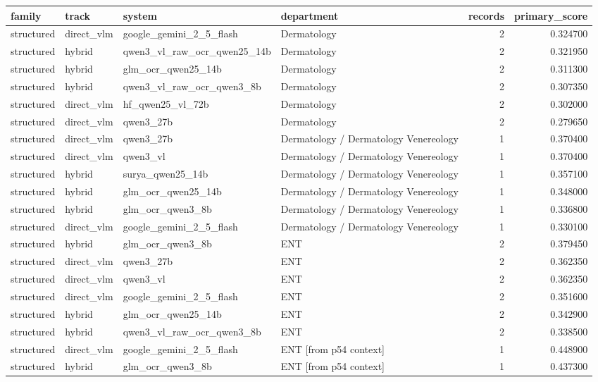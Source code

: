 \begin{tabular}{llllrr}
\toprule
family & track & system & department & records & primary\_score \\
\midrule
structured & direct\_vlm & google\_gemini\_2\_5\_flash & Dermatology & 2 & 0.324700 \\
structured & hybrid & qwen3\_vl\_raw\_ocr\_qwen25\_14b & Dermatology & 2 & 0.321950 \\
structured & hybrid & glm\_ocr\_qwen25\_14b & Dermatology & 2 & 0.311300 \\
structured & hybrid & qwen3\_vl\_raw\_ocr\_qwen3\_8b & Dermatology & 2 & 0.307350 \\
structured & direct\_vlm & hf\_qwen25\_vl\_72b & Dermatology & 2 & 0.302000 \\
structured & direct\_vlm & qwen3\_27b & Dermatology & 2 & 0.279650 \\
structured & direct\_vlm & qwen3\_27b & Dermatology / Dermatology Venereology & 1 & 0.370400 \\
structured & direct\_vlm & qwen3\_vl & Dermatology / Dermatology Venereology & 1 & 0.370400 \\
structured & hybrid & surya\_qwen25\_14b & Dermatology / Dermatology Venereology & 1 & 0.357100 \\
structured & hybrid & glm\_ocr\_qwen25\_14b & Dermatology / Dermatology Venereology & 1 & 0.348000 \\
structured & hybrid & glm\_ocr\_qwen3\_8b & Dermatology / Dermatology Venereology & 1 & 0.336800 \\
structured & direct\_vlm & google\_gemini\_2\_5\_flash & Dermatology / Dermatology Venereology & 1 & 0.330100 \\
structured & hybrid & glm\_ocr\_qwen3\_8b & ENT & 2 & 0.379450 \\
structured & direct\_vlm & qwen3\_27b & ENT & 2 & 0.362350 \\
structured & direct\_vlm & qwen3\_vl & ENT & 2 & 0.362350 \\
structured & direct\_vlm & google\_gemini\_2\_5\_flash & ENT & 2 & 0.351600 \\
structured & hybrid & glm\_ocr\_qwen25\_14b & ENT & 2 & 0.342900 \\
structured & hybrid & qwen3\_vl\_raw\_ocr\_qwen3\_8b & ENT & 2 & 0.338500 \\
structured & direct\_vlm & google\_gemini\_2\_5\_flash & ENT [from p54 context] & 1 & 0.448900 \\
structured & hybrid & glm\_ocr\_qwen3\_8b & ENT [from p54 context] & 1 & 0.437300 \\

\end{tabular}

